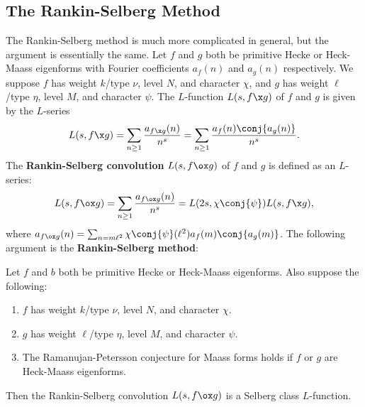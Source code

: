     \subsection*{The Rankin-Selberg Method}
      The Rankin-Selberg method is much more complicated in general, but the argument is essentially the same. Let $f$ and $g$ both be primitive Hecke or Heck-Maass eigenforms with Fourier coefficients $a_{f}(n)$ and $a_{g}(n)$ respectively. We suppose $f$ has weight $k$/type $\nu$, level $N$, and character $\chi$, and $g$ has weight $\ell$/type $\eta$, level $M$, and character $\psi$. 
      The $L$-function $L(s,f \x g)$ of $f$ and $g$ is given by the $L$-series
      \[
        L(s,f \x g) = \sum_{n \ge 1}\frac{a_{f \x g}(n)}{n^{s}} = \sum_{n \ge 1}\frac{a_{f}(n)\conj{a_{g}(n)}}{n^{s}}.
      \]
      The \textbf{Rankin-Selberg convolution} $L(s,f \ox g)$ of $f$ and $g$ is defined as an $L$-series:
      \[
        L(s,f \ox g) = \sum_{n \ge 1}\frac{a_{f \ox g}(n)}{n^{s}} = L(2s,\chi\conj{\psi})L(s,f \x g),
      \]
      where $a_{f \ox g}(n) = \sum_{n = m\ell^{2}}\chi\conj{\psi}(\ell^{2})a_{f}(m)\conj{a_{g}(m)}$. The following argument is the \textbf{Rankin-Selberg method}:

      \begin{method}
        Let $f$ and $b$ both be primitive Hecke or Heck-Maass eigenforms. Also suppose the following: 
        \begin{enumerate}[label=(\roman*)]
          \item $f$ has weight $k$/type $\nu$, level $N$, and character $\chi$.
          \item $g$ has weight $\ell$/type $\eta$, level $M$, and character $\psi$.
          \item The Ramanujan-Petersson conjecture for Maass forms holds if $f$ or $g$ are Heck-Maass eigenforms.
        \end{enumerate}
        Then the Rankin-Selberg convolution $L(s,f \ox g)$ is a Selberg class $L$-function.
      \end{method}

